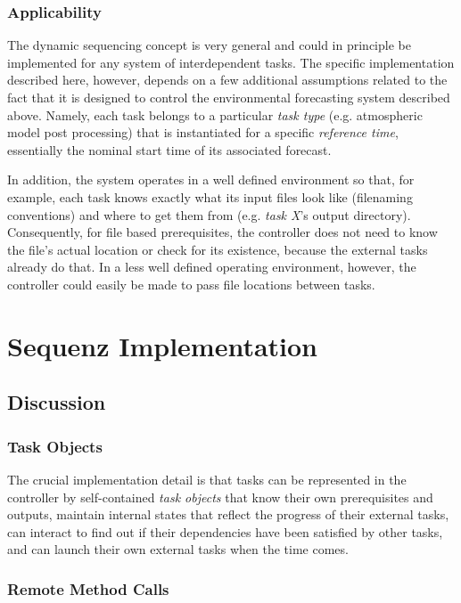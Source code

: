 \documentclass[11pt,a4paper]{report}
\begin{document}
\subsection{Applicability}

The dynamic sequencing concept is very general and could in principle be
implemented for any system of interdependent tasks.  The specific
implementation described here, however, depends on a few additional
assumptions related to the fact that it is designed to control the
environmental forecasting system described above.  Namely, each task
belongs to a particular {\em task type} (e.g. atmospheric model post
processing) that is instantiated for a specific {\em reference time},
essentially the nominal start time of its associated forecast. 

In addition, the system operates in a well defined environment so that,
for example, each task knows exactly what its input files look like
(filenaming conventions) and where to get them from (e.g. {\em task X}'s
output directory). Consequently, for file based prerequisites, the
controller does not need to know the file's actual location or check for
its existence, because the external tasks already do that. In a less
well defined operating environment, however, the controller could easily
be made to pass file locations between tasks.


\chapter{Sequenz Implementation}


\section{Discussion}

\subsection{Task Objects}

The crucial implementation detail is that tasks can be represented in
the controller by self-contained {\em task objects} that know their own
prerequisites and outputs, maintain internal states that reflect the
progress of their external tasks, can interact to find out if their
dependencies have been satisfied by other tasks, and can launch their
own external tasks when the time comes. 

\subsection{Remote Method Calls}
\end{document}

